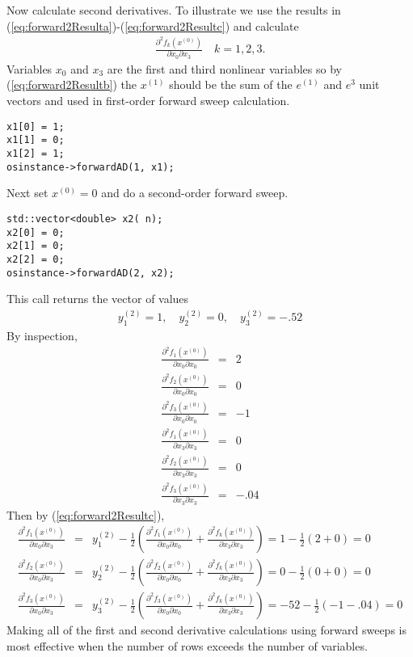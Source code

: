 \documentclass[11pt]{article}
\newcommand{\DD}[3]{ \frac{\partial^2 #1}{\partial #2 \partial #3} }
\renewcommand{\_}{{\char"5F}}
\renewcommand{\{}{{\char"7B}}
\renewcommand{\}}{{\char"7D}}
\renewcommand{\^}{{\char"0D}}
\renewcommand{\'}{{\char"0D}}
\begin{document}
Now calculate second derivatives.  To illustrate we use the results in (\ref{eq:forward2Resulta})-(\ref{eq:forward2Resultc}) and calculate
\begin{eqnarray*}
\DD{f_{k}(x^{(0)})}{x_{0}}{x_{3}} \quad k = 1, 2, 3.
\end{eqnarray*}
Variables $x_{0}$ and $x_{3}$ are the first and third nonlinear variables so by  (\ref{eq:forward2Resultb}) the $x^{(1)}$ should be the sum of the $e^{(1)}$ and $e^{3}$ unit vectors and used in first-order forward sweep calculation.
\begin{verbatim}
x1[0] = 1;
x1[1] = 0;
x1[2] = 1;
osinstance->forwardAD(1, x1);
\end{verbatim}
Next set $x^{(0)} = 0$ and do a second-order forward sweep.
\begin{verbatim}
std::vector<double> x2( n);
x2[0] = 0;
x2[1] = 0;
x2[2] = 0;
osinstance->forwardAD(2, x2);
\end{verbatim}
This call returns the vector of  values
\begin{eqnarray*}
y_{1}^{(2)}  = 1, \quad y_{2}^{(2)}  = 0, \quad y_{3}^{(2)} = -.52
\end{eqnarray*}
By inspection,
\begin{eqnarray*}
\DD{f_{1}(x^{(0)})}{x_{0}}{x_{0}} &=& 2 \\
\DD{f_{2}(x^{(0)})}{x_{0}}{x_{0}} &=&  0\\
\DD{f_{3}(x^{(0)})}{x_{0}}{x_{0}} &=& -1 \\
\DD{f_{1}(x^{(0)})}{x_{3}}{x_{3}} &=& 0 \\
\DD{f_{2}(x^{(0)})}{x_{3}}{x_{3}} &=& 0\\
\DD{f_{3}(x^{(0)})}{x_{3}}{x_{3}} &=& -.04 
\end{eqnarray*}
Then by (\ref{eq:forward2Resultc}),
\begin{eqnarray*}
\DD{f_{1}(x^{(0)})}{x_{0}}{x_{3}} &=&  y_{1}^{(2)}  -  \frac{1}{2} \left( \DD{f_{1}(x^{(0)})}{x_{0}}{x_{0}}  +  \DD{f_{k}(x^{(0)})}{x_{3}}{x_{3}}  \right) =   1 -  \frac{1}{2}(2 +  0) = 0 \\
\DD{f_{2}(x^{(0)})}{x_{0}}{x_{3}} &=&   y_{2}^{(2)}  -  \frac{1}{2} \left( \DD{f_{2}(x^{(0)})}{x_{0}}{x_{0}}  +  \DD{f_{k}(x^{(0)})}{x_{3}}{x_{3}}  \right)  = 0 -  \frac{1}{2}(0 +  0) = 0 \\
\DD{f_{3}(x^{(0)})}{x_{0}}{x_{3}} &=&  y_{3}^{(2)}  -  \frac{1}{2} \left( \DD{f_{3}(x^{(0)})}{x_{0}}{x_{0}}  +  \DD{f_{k}(x^{(0)})}{x_{3}}{x_{3}}  \right) = -52 -  \frac{1}{2}(-1 - .04) = 0
\end{eqnarray*}
Making all of the first and second derivative calculations using forward sweeps is most effective when the number of rows exceeds the number of variables. 
\end{document}
